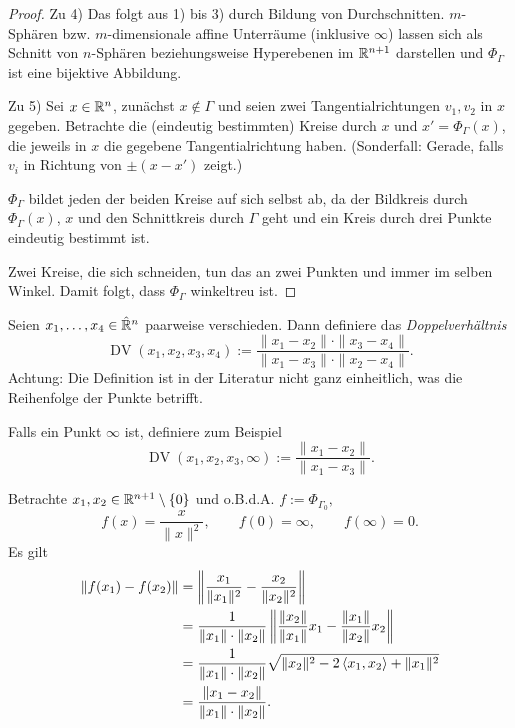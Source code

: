 \begin{proof}
  Zu 4) Das folgt aus 1) bis 3) durch Bildung von Durchschnitten. $m$-Sphären
  bzw. $m$-dimensionale affine Unterräume (inklusive $\infty$) lassen sich als
  Schnitt von $n$-Sphären beziehungsweise Hyperebenen im $\mathbb{R}^{n+1}$
  darstellen und $\Phi_\Gamma$ ist eine bijektive Abbildung.

  Zu 5) Sei $x \in \mathbb{R}^n$, zunächst $x \notin \Gamma$ und seien zwei
  Tangentialrichtungen $v_1, v_2$ in $x$ gegeben. Betrachte die (eindeutig
  bestimmten) Kreise durch $x$ und $x' = \Phi_\Gamma(x)$, die jeweils in $x$ die
  gegebene Tangentialrichtung haben. (Sonderfall: Gerade, falls $v_i$ in
  Richtung von $\pm(x-x')$ zeigt.)

  $\Phi_\Gamma$ bildet jeden der beiden Kreise auf sich selbst ab, da der
  Bildkreis durch $\Phi_\Gamma(x)$, $x$ und den Schnittkreis durch $\Gamma$ geht
  und ein Kreis durch drei Punkte eindeutig bestimmt ist.

  Zwei Kreise, die sich schneiden, tun das an zwei Punkten und immer im selben
  Winkel. Damit folgt, dass $\Phi_\Gamma$ winkeltreu ist.
\end{proof}

\begin{defn*}
 Seien $x_1, \ldots, x_4 \in \hat{\mathbb{R}}^n$ paarweise verschieden. Dann
 definiere das \emph{Doppelverhältnis} 
 \[ \operatorname{DV}(x_1, x_2, x_3, x_4) := \frac{ \| x_1 - x_2 \| \cdot \| x_3
     - x_4 \| }{ \| x_1 - x_3 \| \cdot \| x_2 - x_4 \| }. \] 
 Achtung: Die Definition ist in der Literatur nicht ganz einheitlich, was die
 Reihenfolge der Punkte betrifft. 

 Falls ein Punkt $\infty$ ist, definiere zum Beispiel
 \[ \operatorname{DV}(x_1, x_2, x_3, \infty) := \frac{\|x_1 - x_2\|}{\|x_1 - x_3\|}. \]
\end{defn*}

Betrachte $x_1, x_2 \in \mathbb{R}^{n+1} \setminus \{ 0 \}$ und o.B.d.A. $f := \Phi_{\Gamma_0},$
\[ f(x) = \frac{x}{\|x\|^2}, \qquad f(0) = \infty, \qquad f(\infty) = 0. \]
Es gilt
\[ \begin{aligned}
    \| f(x_1) - f(x_2) \| 
    &= \left\| \frac{x_1}{\|x_1\|^2} - \frac{x_2}{\|x_2\|^2} \right\| \\
    &= \frac{1}{ \| x_1 \| \cdot \| x_2 \|} 
       \left\| \frac{\| x_2 \|}{\| x_1 \|} x_1 - \frac{\| x_1 \|}{\| x_2 \|} x_2 \right\| \\
    &= \frac{1}{ \| x_1 \| \cdot \| x_2 \|} \sqrt{\| x_2 \|^2 - 2 \left\langle x_1,x_2 \right\rangle + \| x_1 \|^2} \\
    &= \frac{ \| x_1 - x_2 \| }{ \| x_1 \| \cdot \| x_2 \| }.
   \end{aligned} \]

